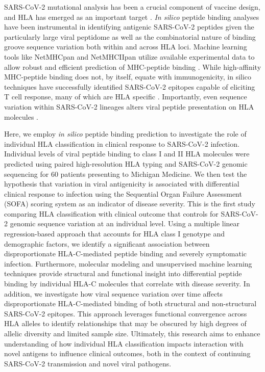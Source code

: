 \documentclass[utf8]{frontiersinFPHY_FAMS} %
\begin{document}
SARS-CoV-2 mutational analysis has been a crucial component of vaccine design, and HLA has emerged as an important target \citep{32106567, 32269766, 32303592, 32295479, 35577837}. \textit{In silico} peptide binding analyses have been instrumental in identifying antigenic SARS-CoV-2 peptides given the particularly large viral peptidome as well as the combinatorial nature of binding groove sequence variation both within and across HLA loci. Machine learning tools like NetMHCpan and NetMHCIIpan utilize available experimental data to allow robust and efficient prediction of MHC-peptide binding \citep{32406916}. While high-affinity MHC-peptide binding does not, by itself, equate with immunogenicity, in silico techniques have successfully identified SARS-CoV-2 epitopes capable of eliciting T cell response, many of which are HLA specific \citep{33128877, 33853928, 33184509}. Importantly, even sequence variation within SARS-CoV-2 lineages alters viral peptide presentation on HLA molecules \citep{34396391}. 

Here, we employ \textit{in silico} peptide binding prediction to investigate the role of individual HLA classification in clinical response to SARS-CoV-2 infection. Individual levels of viral peptide binding to class I and II HLA molecules were predicted using paired high-resolution HLA typing and SARS-CoV-2 genomic sequencing for 60 patients presenting to Michigan Medicine. We then test the hypothesis that variation in viral antigenicity is associated with differential clinical response to infection using the Sequential Organ Failure Assessment (SOFA) scoring system as an indicator of disease severity. This is the first study comparing HLA classification with clinical outcome that controls for SARS-CoV-2 genomic sequence variation at an individual level. Using a multiple linear regression-based approach that accounts for HLA class I genotype and demographic factors, we identify a significant association between disproportionate HLA-C-mediated peptide binding and severely symptomatic infection. Furthermore, molecular modeling and unsupervised machine learning techniques provide structural and functional insight into differential peptide binding by individual HLA-C molecules that correlate with disease severity. In addition, we investigate how viral sequence variation over time affects disproportionate HLA-C-mediated binding of both structural and non-structural SARS-CoV-2 epitopes. This approach leverages functional convergence across HLA alleles to identify relationships that may be obscured by high degrees of allelic diversity and limited sample size. Ultimately, this research aims to enhance understanding of how individual HLA classification impacts interaction with novel antigens to influence clinical outcomes, both in the context of continuing SARS-CoV-2 transmission and novel viral pathogens.
\end{document}

